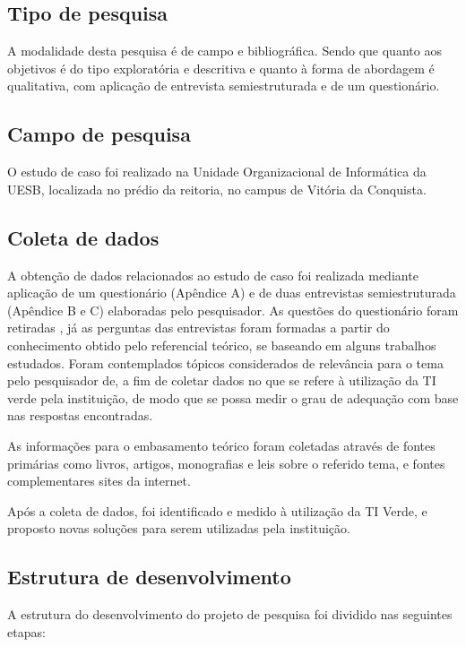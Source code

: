 \subsection{Tipo de pesquisa}
A modalidade desta pesquisa é de campo e bibliográfica. Sendo que quanto aos objetivos é do tipo exploratória e descritiva e quanto à forma de abordagem é qualitativa, com aplicação de entrevista semiestruturada e de um questionário.

\subsection{Campo de pesquisa}
O estudo de caso foi realizado na Unidade Organizacional de Informática da UESB, localizada no prédio da reitoria, no campus de Vitória da Conquista.

\subsection{Coleta de dados}
A obtenção de dados relacionados ao estudo de caso foi realizada mediante aplicação de um questionário (Apêndice A) e de duas entrevistas semiestruturada (Apêndice B e C) elaboradas pelo pesquisador. As questões do questionário foram retiradas , já as perguntas das entrevistas foram formadas a partir do conhecimento obtido pelo referencial teórico, se baseando em alguns trabalhos estudados. Foram contemplados tópicos considerados de relevância para o tema pelo pesquisador de, a fim de coletar dados no que se refere à utilização da TI verde pela instituição, de modo que se possa medir o grau de adequação com base nas respostas encontradas. 

As informações para o embasamento teórico foram coletadas através de fontes primárias como livros, artigos, monografias e leis sobre o referido tema, e fontes complementares sites da internet. 

Após a coleta de dados, foi identificado e medido à utilização da TI Verde, e proposto novas soluções para serem utilizadas pela instituição.

\subsection{Estrutura de desenvolvimento}
A estrutura do desenvolvimento do projeto de pesquisa foi dividido nas seguintes etapas:

